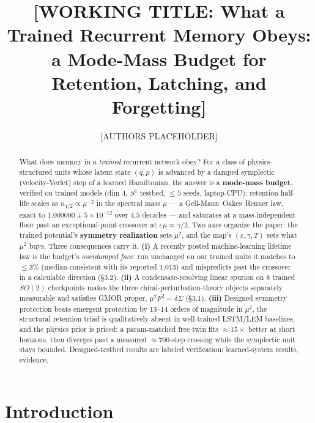 \documentclass[10pt]{article}
\title{\textbf{[WORKING TITLE: What a Trained Recurrent Memory Obeys:\\ a Mode-Mass Budget for Retention, Latching, and Forgetting]}}
\author{[AUTHORS PLACEHOLDER]}
\date{}
\begin{document}
\sloppy
\maketitle

\begin{abstract}
What does memory in a \emph{trained} recurrent network obey? For a class of physics-structured units whose latent state $(q,p)$ is advanced by a damped symplectic (velocity-Verlet) step of a learned Hamiltonian, the answer is a \textbf{mode-mass budget}, verified on trained models (dim $4$, $S^1$ testbed, $\le5$ seeds, laptop-CPU): retention half-life scales as $n_{1/2}\propto\mu^{-2}$ in the spectral mass $\mu$ --- a Gell-Mann--Oakes--Renner law, exact to $1.000000\pm5\!\times\!10^{-12}$ over $4.5$ decades --- and saturates at a mass-independent floor past an exceptional-point crossover at $\varepsilon\mu\approx\gamma/2$. Two axes organize the paper: the trained potential's \textbf{symmetry realization} sets $\mu^2$, and the map's $(\varepsilon,\gamma,T)$ sets what $\mu^2$ buys. Three consequences carry it. \textbf{(i)} A recently posted machine-learning lifetime law is the budget's \emph{overdamped face}: run unchanged on our trained units it matches to $\le3\%$ (median-consistent with its reported $1.013$) and mispredicts past the crossover in a calculable direction (\S3.2). \textbf{(ii)} A condensate-resolving linear spurion on $8$ trained $SO(2)$ checkpoints makes the three chiral-perturbation-theory objects separately measurable and satisfies GMOR proper, $\mu^2F^2=\delta\Sigma$ (\S3.1). \textbf{(iii)} Designed symmetry protection beats emergent protection by $13$--$14$ orders of magnitude in $\mu^2$, the structural retention triad is qualitatively absent in well-trained LSTM/LEM baselines, and the physics prior is priced: a param-matched free twin fits $\approx15\times$ better at short horizons, then diverges past a measured $\approx700$-step crossing while the symplectic unit stays bounded. Designed-testbed results are labeled verification; learned-system results, evidence.
\end{abstract}

\section{Introduction}
\end{document}
